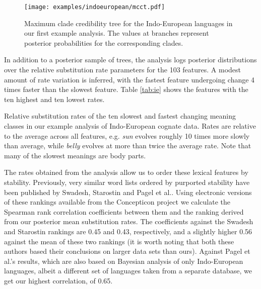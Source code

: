 \documentclass[twocolumn,10pt]{scrartcl}
\begin{document}
\begin{figure}[t]
	\begin{center}
	\texttt{[image: examples/indoeuropean/mcct.pdf]}
	\end{center}
	\caption{Maximum clade credibility tree for the Indo-European languages in our first example analysis.  The values at branches represent posterior probabilities for the corresponding clades.}
\label{fig:ie}
\end{figure}

In addition to a posterior sample of trees, the analysis logs posterior distributions over the relative substitution rate parameters for the 103 features.  A modest amount of rate variation is inferred, with the fastest feature undergoing change 4 times faster than the slowest feature.  Table \ref{tab:ie} shows the features with the ten highest and ten lowest rates.  
\begin{table}[t]
	\begin{center}
		
	\end{center}
	\caption{Relative substitution rates of the ten slowest and fastest changing meaning classes in our example analysis of Indo-European cognate data.  Rates are relative to the average across all features, e.g. \emph{sun} evolves roughly 10 times more slowly than average, while \emph{belly} evolves at more than twice the average rate.  Note that many of the slowest meanings are body parts.}
\label{tab:ie}
\end{table}

The rates obtained from the analysis allow us to order these lexical features by stability.
Previously, very similar word lists ordered by purported stability have been published by Swadesh\cite{Swadesh1955}, Starostin\cite{Starostin2007} and Pagel et al.\cite{Pagel2007}.
Using electronic versions of these rankings available from the Concepticon project\cite{List2015} we calculate the Spearman rank correlation coefficients between them and the ranking derived from our posterior mean substitution rates. The coefficients against the Swadesh and Starostin rankings are 0.45 and 0.43, respectively, and a slightly higher 0.56 against the mean of these two rankings (it is worth noting that both these authors based their conclusions on larger data sets than ours).  Against Pagel et al.'s results, which are also based on Bayesian analysis of only Indo-European languages, albeit a different set of languages taken from a separate database, we get our highest correlation, of 0.65.
\end{document}
